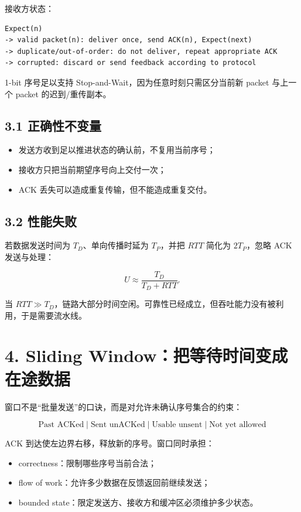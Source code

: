 \documentclass[UTF8,fontset=none,11pt,a4paper]{ctexart}
\providecommand{\tightlist}{\setlength{\itemsep}{0pt}\setlength{\parskip}{0pt}}
\begin{document}
接收方状态：

\begin{lstlisting}
Expect(n)
-> valid packet(n): deliver once, send ACK(n), Expect(next)
-> duplicate/out-of-order: do not deliver, repeat appropriate ACK
-> corrupted: discard or send feedback according to protocol
\end{lstlisting}

1-bit 序号足以支持 Stop-and-Wait，因为任意时刻只需区分当前新 packet
与上一个 packet 的迟到/重传副本。

\subsection{3.1
正确性不变量}\label{31-ux6b63ux786eux6027ux4e0dux53d8ux91cf}

\begin{itemize}
\tightlist
\item
  发送方收到足以推进状态的确认前，不复用当前序号；
\item
  接收方只把当前期望序号向上交付一次；
\item
  ACK 丢失可以造成重复传输，但不能造成重复交付。
\end{itemize}

\subsection{3.2 性能失败}\label{32-ux6027ux80fdux5931ux8d25}

若数据发送时间为 \(T_D\)、单向传播时延为 \(T_P\)，并把 \(RTT\) 简化为
\(2T_P\)，忽略 ACK 发送与处理：

\[
U\approx\frac{T_D}{T_D+RTT}.
\]

当
\(RTT\gg T_D\)，链路大部分时间空闲。可靠性已经成立，但吞吐能力没有被利用，于是需要流水线。

\section{4. Sliding
Window：把等待时间变成在途数据}\label{4-sliding-windowux628aux7b49ux5f85ux65f6ux95f4ux53d8ux6210ux5728ux9014ux6570ux636e}

窗口不是``批量发送''的口诀，而是对允许未确认序号集合的约束：

\[
\boxed{
\text{Past ACKed}
\mid \text{Sent unACKed}
\mid \text{Usable unsent}
\mid \text{Not yet allowed}
}
\]

ACK 到达使左边界右移，释放新的序号。窗口同时承担：

\begin{itemize}
\tightlist
\item
  correctness：限制哪些序号当前合法；
\item
  flow of work：允许多少数据在反馈返回前继续发送；
\item
  bounded state：限定发送方、接收方和缓冲区必须维护多少状态。
\end{itemize}
\end{document}
